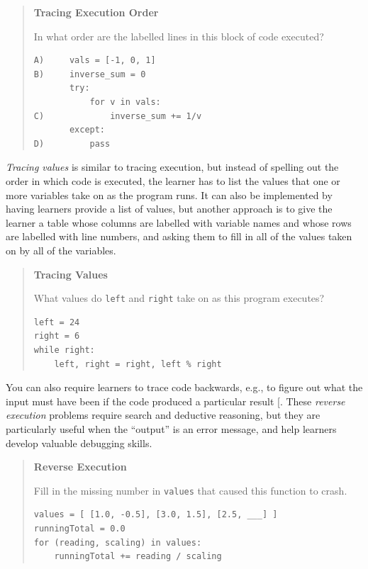 \begin{quote}\setlength{\parindent}{0pt}
\textbf{Tracing Execution Order}

In what order are the labelled lines in this block of code executed?

\begin{lstlisting}
A)     vals = [-1, 0, 1]
B)     inverse_sum = 0
       try:
           for v in vals:
C)             inverse_sum += 1/v
       except:
D)         pass
\end{lstlisting}
\end{quote}

\emph{Tracing values} is similar to tracing execution, but instead of
spelling out the order in which code is executed, the learner has to
list the values that one or more variables take on as the program runs.
It can also be implemented by having learners provide a list of values,
but another approach is to give the learner a table whose columns are
labelled with variable names and whose rows are labelled with line
numbers, and asking them to fill in all of the values taken on by all of
the variables.

\begin{quote}\setlength{\parindent}{0pt}
\textbf{Tracing Values}

What values do \texttt{left} and \texttt{right} take on as this program executes?

\begin{lstlisting}
left = 24
right = 6
while right:
    left, right = right, left % right
\end{lstlisting}
\end{quote}

You can also require learners to trace code backwards, e.g., to figure
out what the input must have been if the code produced a particular
result {[}\protect[\hyperlink{b:Armo2008}{Armo2008}]{]}. These \emph{reverse execution} problems require
search and deductive reasoning, but they are particularly useful when
the ``output'' is an error message, and help learners develop valuable
debugging skills.

\begin{quote}\setlength{\parindent}{0pt}
\textbf{Reverse Execution}

Fill in the missing number in \texttt{values} that caused this function to
crash.

\begin{lstlisting}
values = [ [1.0, -0.5], [3.0, 1.5], [2.5, ___] ]
runningTotal = 0.0
for (reading, scaling) in values:
    runningTotal += reading / scaling
\end{lstlisting}
\end{quote}

